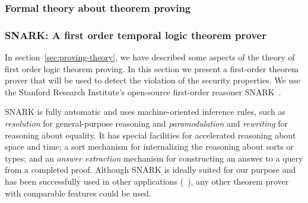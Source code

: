 \subsubsection{Formal theory about theorem proving}





\subsubsection{SNARK: A first order temporal logic theorem prover}
\label{sec:proof-detects-violation}
In section~\ref{sec:proving-theory}, we have described some aspects of the theory of first order logic theorem proving.
In this section we  present a first-order theorem prover that will be used to detect the violation of the security properties.
We use the Stanford Research Institute's open-source first-order reasoner SNARK~\cite{snark-Stickel2000}.

SNARK is fully automatic and uses machine-oriented inference rules, such as \textit{resolution} for general-purpose reasoning and \textit{paramodulation} and \textit{rewriting} for reasoning about equality.
It has special facilities
for accelerated reasoning about space and time; a sort mechanism for internalizing the reasoning about sorts or types; and an \textit{answer extraction} mechanism for constructing an answer to a query from a completed proof. 
Although SNARK is ideally suited for our purpose and has been successfully used in other applications (\eg~\cite{AICPub2006:2015}), any other theorem prover with comparable features could be used.

